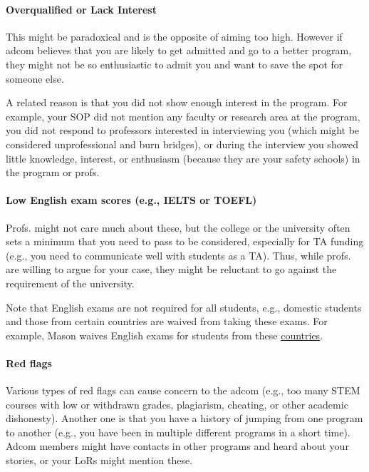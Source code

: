 \documentclass[oneside,11pt,dvipsnames]{book}
\begin{document}
\paragraph{Overqualified or Lack Interest}  This might be paradoxical and is the opposite of aiming too high. However if adcom believes that you are likely to get admitted and go to a better program, they might not be so enthusiastic to admit you and want to save the spot for someone else.

A related reason is that you did not show enough interest in the program.
For example, your SOP did not mention any faculty or research area at the program, you did not respond to professors interested in interviewing you (which might be considered unprofessional and burn bridges), or during the interview you showed little knowledge, interest, or enthusiasm (because they are your safety schools) in the program or profs.


\paragraph{Low English exam scores (e.g., IELTS or TOEFL)}  Profs. might not care much about these, but the college or the university often sets a minimum that you need to pass to be considered, especially for TA funding (e.g., you need to communicate well with students as a TA).  Thus, while profs. are willing to argue for your case, they might be reluctant to go against the requirement of the university.

Note that English exams are not required for all students, e.g., domestic students and those from certain countries are waived from taking these exams.  For example, Mason waives English exams for students from these \href{https://github.com/dynaroars/dynaroars.github.io/wiki/About-Mason#standard-tests-waiver-eligible-countries}{countries}.


\paragraph{Red flags} Various types of red flags can cause concern to the adcom (e.g., too many STEM courses with low or withdrawn grades, plagiarism, cheating, or other academic dishonesty). Another one is that you have a history of jumping from one program to another (e.g., you have been in multiple different programs in a short time). Adcom members might have contacts in other programs and heard about your stories, or your LoRs might mention these.
\end{document}

